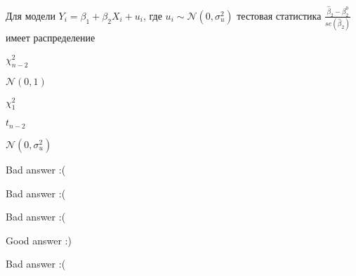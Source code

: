 
\begin{question}
Для модели \(Y_i = \beta_1 + \beta_2 X_i + u_i\), где \(u_i \sim \mathcal{N}(0, \sigma^2_u)\)
тестовая статистика \(\frac{ \hat \beta_2 - \beta^0_2 }{ se(\hat \beta_2)}\) имеет распределение
\begin{answerlist}
  \item \(\chi^2_{n-2}\)
  \item \(\mathcal{N}(0,1)\)
  \item \(\chi^2_1\)
  \item \(t_{n-2}\)
  \item \(\mathcal{N}(0, \sigma_u^2)\)
\end{answerlist}
\end{question}

\begin{solution}
\begin{answerlist}
  \item Bad answer :(
  \item Bad answer :(
  \item Bad answer :(
  \item Good answer :)
  \item Bad answer :(
\end{answerlist}
\end{solution}

